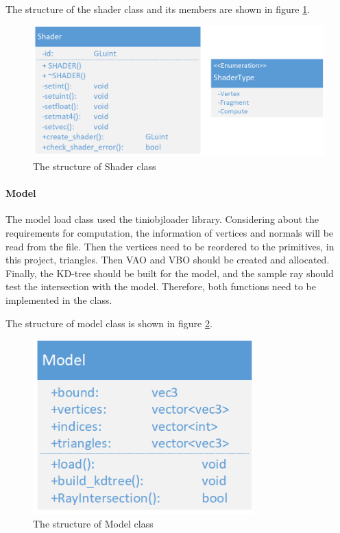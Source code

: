 \hspace*{\fill}

The structure of the shader class and its members are shown in figure \ref{ds:shaderclass}.

\begin{figure}[htbp]
    \centering
    \includegraphics[width=16cm]{Images/Chap4/Shader.png}
    \caption{The structure of Shader class}
    \label{ds:shaderclass}
\end{figure}

\paragraph{Model}

The model load class used the tiniobjloader library. Considering about the requirements for computation, the information of vertices and normals will be read from the file. Then the vertices need to be reordered to the primitives, in this project, triangles. Then VAO and VBO should be created and allocated. Finally, the KD-tree should be built for the model, and the sample ray should test the intersection with the model. Therefore, both functions need to be implemented in the class.

\hspace*{\fill}

The structure of model class is shown in figure \ref{ds:modelclass}.

\begin{figure}[htbp]
    \centering
    \includegraphics[width=8.5cm]{Images/Chap4/Model.png}
    \caption{The structure of Model class}
    \label{ds:modelclass}
\end{figure}

